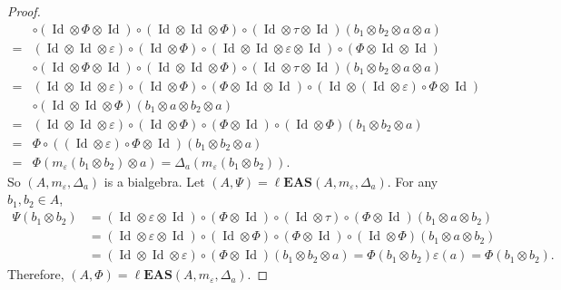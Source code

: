 \documentclass[10pt,a4paper]{amsart}
\numberwithin{equation}{section}
\newcommand{\leas}{\ell\mathbf{EAS}}
\begin{document}
\begin{proof}
\begin{align*}
&\circ (\operatorname{Id}\otimes \Phi\otimes \operatorname{Id})\circ(\operatorname{Id} \otimes \operatorname{Id} \otimes \Phi)\circ (\operatorname{Id} \otimes \tau\otimes \operatorname{Id})(b_1\otimes b_2\otimes a\otimes a)\\
={}&(\operatorname{Id} \otimes \operatorname{Id} \otimes \varepsilon)\circ (\operatorname{Id} \otimes \Phi)\circ (\operatorname{Id}\otimes \operatorname{Id} \otimes \varepsilon \otimes \operatorname{Id})\circ (\Phi \otimes \operatorname{Id}\otimes \operatorname{Id})\\
&\circ (\operatorname{Id}\otimes \Phi\otimes \operatorname{Id})\circ(\operatorname{Id} \otimes \operatorname{Id} \otimes \Phi)\circ (\operatorname{Id} \otimes \tau\otimes \operatorname{Id})(b_1\otimes b_2\otimes a\otimes a)\\
={}&(\operatorname{Id} \otimes \operatorname{Id} \otimes \varepsilon)\circ (\operatorname{Id} \otimes \Phi)\circ (\Phi \otimes \operatorname{Id}\otimes \operatorname{Id})\circ (\operatorname{Id}\otimes (\operatorname{Id}\otimes \varepsilon)\circ\Phi\otimes \operatorname{Id})\\
&\circ(\operatorname{Id} \otimes \operatorname{Id} \otimes \Phi)(b_1\otimes a\otimes b_2\otimes a)\\
={}&(\operatorname{Id} \otimes \operatorname{Id} \otimes \varepsilon)\circ (\operatorname{Id} \otimes \Phi)\circ (\Phi \otimes \operatorname{Id})\circ(\operatorname{Id} \otimes \Phi)(b_1\otimes b_2\otimes a)
\\
={}&\Phi\circ((\operatorname{Id} \otimes \varepsilon)\circ \Phi \otimes \operatorname{Id})(b_1\otimes b_2\otimes a)\\
={}&\Phi(m_\varepsilon(b_1\otimes b_2)\otimes a)
=\Delta_a(m_\varepsilon(b_1\otimes b_2)).
\end{align*}
So $(A,m_\varepsilon,\Delta_a)$ is a bialgebra. Let $(A,\Psi)=\leas(A,m_\varepsilon,\Delta_a)$. For any $b_1,b_2\in A$,
\begin{align*}
\Psi(b_1\otimes b_2)&=(\operatorname{Id} \otimes \varepsilon\otimes \operatorname{Id})\circ (\Phi\otimes \operatorname{Id})\circ (\operatorname{Id} \otimes \tau)\circ (\Phi\otimes \operatorname{Id})(b_1\otimes a\otimes b_2)\\
&=(\operatorname{Id} \otimes \varepsilon\otimes \operatorname{Id})\circ (\operatorname{Id}\otimes \Phi)\circ (\Phi \otimes \operatorname{Id})\circ (\operatorname{Id}\otimes \Phi)(b_1\otimes a\otimes b_2)\\
&=(\operatorname{Id} \otimes \operatorname{Id} \otimes \varepsilon)\circ (\Phi\otimes \operatorname{Id})(b_1\otimes b_2\otimes a)=\Phi(b_1\otimes b_2)\varepsilon(a)=\Phi(b_1\otimes b_2).
\end{align*}
Therefore, $(A,\Phi)=\leas(A,m_\varepsilon,\Delta_a)$. \end{proof}
\end{document}
